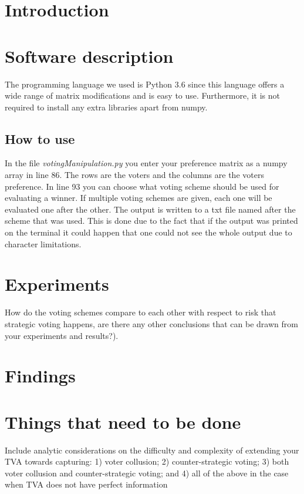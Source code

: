 \section{Introduction}


\section{Software description}
The programming language we used is Python 3.6 since this language offers a wide range of matrix modifications and is easy to use. Furthermore, it is not required to install any extra libraries apart from numpy. 

\subsection{How to use}
In the file \textit{votingManipulation.py} you enter your preference matrix as a numpy array in line 86. The rows are the voters and the columns are the voters preference. In line 93 you can choose what voting scheme should be used for evaluating a winner. If multiple voting schemes are given, each one will be evaluated one after the other. The output is written to a txt file named after the scheme that was used. This is done due to the fact that if the output was printed on the terminal it could happen that one could not see the whole output due to character limitations. 

\section{Experiments}
How do the voting schemes compare to each other with respect to risk that strategic voting happens, are there any other conclusions that can be drawn from your experiments and results?).

\section{Findings}


\section{Things that need to be done}
Include analytic considerations on the difficulty and complexity of extending your TVA towards capturing: 1) voter collusion; 2) counter-strategic voting; 3) both voter collusion and counter-strategic voting; and 4) all of the above in the case when TVA does not have perfect information
